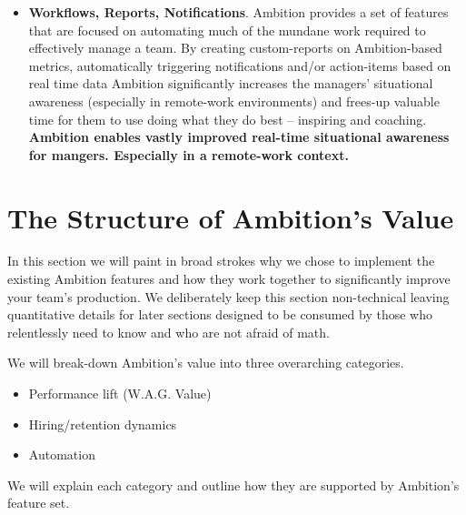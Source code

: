 \documentclass[paper=a4, fontsize=11pt abstract]{scrartcl}
\numberwithin{equation}{section}		%
\numberwithin{figure}{section}			%
\numberwithin{table}{section}				%
\begin{document}
\begin{itemize}
   \item \textbf{Workflows, Reports, Notifications}. Ambition provides a set of features that are focused on automating much of the mundane work required to effectively manage a team.  By creating custom-reports on Ambition-based metrics, automatically triggering notifications and/or action-items based on real time data Ambition significantly increases the managers' situational awareness (especially in remote-work environments) and frees-up valuable time for them to use doing what they do best -- inspiring and coaching. \textbf{Ambition enables vastly improved real-time situational awareness for mangers.  Especially in a remote-work context.} 
    
\end{itemize}

\section{The Structure of Ambition's Value}
In this section we will paint in broad strokes why we chose to implement the existing Ambition features and how they work together to significantly improve your team's production.  We deliberately keep this section non-technical leaving quantitative details for later sections designed to be consumed by those who relentlessly need to know and who are not afraid of math.

We will break-down Ambition's value into three overarching categories.
\begin{itemize}
    \item Performance lift (W.A.G. Value)
    \item Hiring/retention dynamics
    \item Automation
\end{itemize}
We will explain each category and outline how they are supported by Ambition's feature set.
\end{document}
